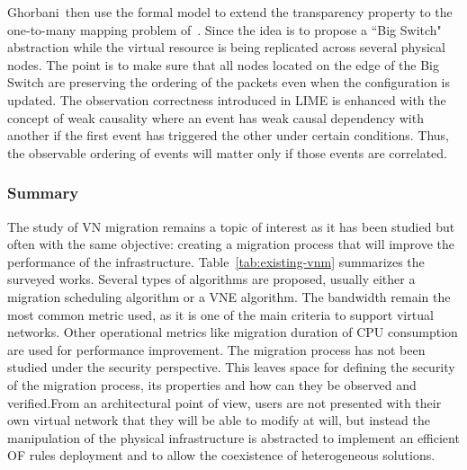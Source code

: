 Ghorbani~\etal then use the formal model to extend the transparency property to the one-to-many mapping problem of~\cite{toward-Ghorbani2014}.
Since the idea is to propose a ``Big Switch" abstraction while  the virtual resource is being replicated across several physical nodes. The point is to make sure that all nodes located on the edge of the Big Switch are preserving the ordering of the packets even when the configuration is updated.
The observation correctness introduced in LIME is enhanced with the concept of weak causality where an event has weak causal dependency with another if the first event has triggered the other under certain conditions.
Thus, the observable ordering of events will matter only if those events are correlated.


\subsubsection{Summary}
The study of VN migration remains a topic of interest as it has been studied but often with the same objective: creating a migration process that will improve the performance of the infrastructure. 
Table~\ref{tab:existing-vnm} summarizes the surveyed works. Several types of algorithms are proposed, usually either a migration scheduling algorithm or a VNE algorithm. 
The bandwidth remain the most common metric used, as it is one of the main criteria to support virtual networks. Other operational metrics like migration duration of CPU consumption are used for performance improvement.
The migration process has not been studied under the security perspective.
This leaves space for defining the security of the migration process, its properties and how can they be observed and verified.From an architectural point of view, users are not presented with their own virtual network that they will be able to modify at will, but instead the manipulation of the physical infrastructure is abstracted to implement an efficient OF rules deployment and to allow the coexistence of heterogeneous solutions.

